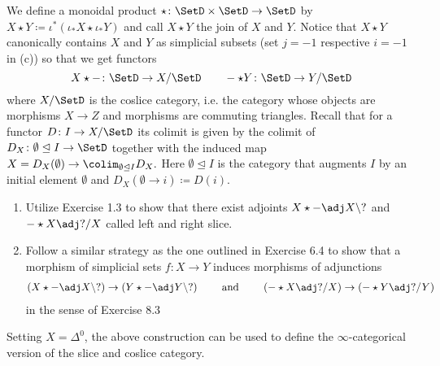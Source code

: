 \begin{Exercise}
	We define a monoidal product $ \star \colon \SetD \times \SetD \to \SetD $ by $ X \star Y  \coloneqq \iota^* ( \iota_* X \star \iota_* Y ) $ and call $ X \star Y $ the join of $ X $ and $ Y $.
	Notice that $ X \star Y $ canonically contains $ X $ and $ Y $ as simplicial subsets (set $ j = - 1 $ respective $ i = - 1 $ in (c)) so that we get functors 
	\[
	X \star - \colon \SetD \to X / \SetD 
	\qquad 
	- \star Y \colon \SetD \to Y / \SetD
	\]  
	where $ X / \SetD $ is the coslice category, i.e. the category whose objects are morphisms $ X \to Z $ and morphisms are commuting triangles. 
	Recall that for a functor $ D \colon I \to X / \SetD $ its colimit is given by the colimit of $ D_X \colon \emptyset \trianglelefteq I \to \SetD $ together with the induced map $ X = D_X ( \emptyset ) \to \colim_{ \emptyset \trianglelefteq I } D_X.$
	Here
	$ \emptyset \trianglelefteq I $ is the category that augments $ I $ by an initial element $ \emptyset $ and $ D_X ( \emptyset \to i ) \coloneqq D ( i ) $.
	
	\begin{enumerate}[label=(\alph*),resume]
		\item 
		Utilize Exercise 1.3 to show that there exist adjoints $ X \star - \adj X \setminus ? $ and $ - \star X \adj ? / X $ called left and right slice.
		
		\item 
		Follow a similar strategy as the one outlined in Exercise 6.4 to show that a morphism of simplicial sets $ f \colon X \to Y $ induces morphisms of adjunctions
		\begin{align*}
			( X \star - \adj X \setminus ? ) \to ( Y \star - \adj Y \setminus ? )
			\qquad
			\text{ and }
			\qquad
			( - \star X \adj ? / X )
			\to 
			( - \star Y \adj ? / Y )
		\end{align*}
		in the sense of Exercise 8.3
	\end{enumerate}
	Setting $ X = \Delta^0 $, the above construction can be used to define the $ \infty $-categorical version of the slice and coslice category.
\end{Exercise}

